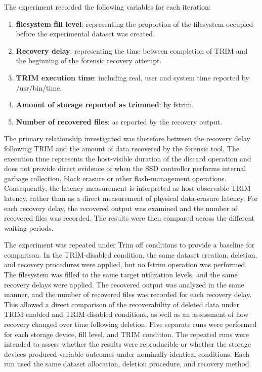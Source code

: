 The experiment recorded the following variables for each iteration:

\begin{enumerate}
    
\item \textbf{filesystem fill level}: representing the proportion of the filesystem occupied before the experimental dataset was created.
\item \textbf{Recovery delay}: representing the time between completion of TRIM and the beginning of the forensic recovery attempt.
\item \textbf{TRIM execution time}: including real, user and system time reported by /usr/bin/time.
\item \textbf{Amount of storage reported as trimmed}: by fstrim.
\item \textbf{Number of recovered files}: as reported by the recovery output.
\end{enumerate}

The primary relationship investigated was therefore between the recovery delay following TRIM and the amount of data recovered by the forensic tool. The execution time 
represents the host-visible duration of the discard operation and does not provide direct evidence of when the SSD controller performs internal garbage collection, 
block erasure or other flash-management operations. Consequently, the latency measurement is interpreted as host-observable TRIM latency, rather than as a direct 
measurement of physical data-erasure latency. For each recovery delay, the recovered output was examined and the number of recovered files was recorded. The results 
were then compared across the different waiting periods.

The experiment was repeated under Trim off conditions to provide a baseline for comparison. In the TRIM-disabled condition, the same dataset creation, deletion, and 
recovery procedures were applied, but no fstrim operation was performed. The filesystem was filled to the same target utilization levels, and the same recovery delays 
were applied. The recovered output was analyzed in the same manner, and the number of recovered files was recorded for each recovery delay. This allowed a direct comparison
of the recoverability of deleted data under TRIM-enabled and TRIM-disabled conditions, as well as an assessment of how recovery changed over time following deletion.
Five separate runs were performed for each storage device, fill level, and TRIM condition. The repeated runs were intended to assess whether the results were reproducible
or whether the storage devices produced variable outcomes under nominally identical conditions. Each run used the same dataset allocation, deletion procedure, and recovery method.

